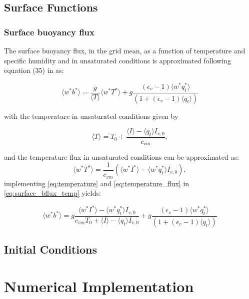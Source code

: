 \documentclass{report}
\begin{document}
\subsection{Surface Functions} \label{sec:Surface functions}
\subsubsection{Surface buoyancy flux}
The surface buoyancy flux, in the grid mean, as a function of temperature and specific humidity and in unsaturated conditions is approximated following equation (35) in \citep{Sommeria77a} as:

\begin{equation}
\langle w^*b^* \rangle = \frac{g}{\langle T \rangle} \langle w^*T^* \rangle + 
g\frac{(\epsilon_v-1) \langle w^*q_t^* \rangle}{(1+(\epsilon_v-1)\langle q_t \rangle)}
    \label{eq:surface_bflux_temp} 
\end{equation}

with the temperature in unsaturated conditions given by 

\begin{equation}
    \langle T \rangle = T_0 + \frac{\langle I \rangle - \langle q_t \rangle I_{v,0}}{c_{vm}},
    \label{eq:temperature}
\end{equation}

and the temperature flux in unsaturated conditions can be approximated as:
\begin{equation}
    \langle w^*T^* \rangle = \frac{1}{c_{vm}}(\langle w^*I^* \rangle  - \langle w^*q_t^* \rangle I_{v,0}),
    \label{eq:temperature_flux}
\end{equation}
implementing \eqref{eq:temperature} and  \eqref{eq:temperature_flux}
in \eqref{eq:surface_bflux_temp} yields:

\begin{equation}
\langle w^*b^* \rangle =g \frac{\langle w^*I^* \rangle  - \langle w^*q_t^* \rangle I_{v,0}}{c_{vm}T_0 + \langle I \rangle - \langle q_t \rangle I_{v,0}} +
g\frac{(\epsilon_v-1) \langle w^*q_t^* \rangle}{(1+(\epsilon_v-1)\langle q_t \rangle)}
    \label{eq:surface_bflux}     
\end{equation}



 \subsection{Initial Conditions} \label{sec:Initial Conditions}


\section{Numerical Implementation} \label{sec:Numerical Implementation}
\end{document}

